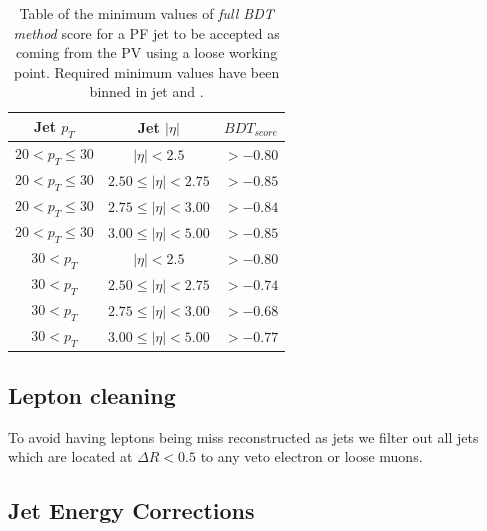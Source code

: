 \begin{table}[!htb]
\centering
\begin{tabular}{|c|c|c|}
\hline
Jet $p_{T}$          & Jet $|\eta|$              & $BDT_{score}$ \\
\hline \hline
$20 < p_{T} \leq 30$ & $|\eta| < 2.5$            & $> -0.80$ \\
$20 < p_{T} \leq 30$ & $2.50 \leq |\eta| < 2.75$ & $> -0.85$ \\
$20 < p_{T} \leq 30$ & $2.75 \leq |\eta| < 3.00$ & $> -0.84$ \\
$20 < p_{T} \leq 30$ & $3.00 \leq |\eta| < 5.00$ & $> -0.85$ \\
$30 < p_{T}$         & $|\eta| < 2.5$            & $> -0.80$ \\
$30 < p_{T}$         & $2.50 \leq |\eta| < 2.75$ & $> -0.74$ \\
$30 < p_{T}$         & $2.75 \leq |\eta| < 3.00$ & $> -0.68$ \\
$30 < p_{T}$         & $3.00 \leq |\eta| < 5.00$ & $> -0.77$ \\
\hline
\end{tabular}
\caption{Table of the minimum values of \textit{full \gls{BDT} method} score for a \gls{PF} jet to be accepted as coming from the \gls{PV} using a loose working point. Required minimum values have been binned in jet \pt and \eta.}
\label{TABLE:EventReconstructionAndSimulation_PileupJetIDFullBDTLooseWorkingPoint}
\end{table}

\subsection{Lepton cleaning}
\label{SECTION:EventReconstructionAndSimulation_Jets_LeptonCleaning}


To avoid having leptons being miss reconstructed as jets we filter out all jets which are located at $\Delta R < 0.5$ to any veto electron or loose muons.

\subsection{Jet Energy Corrections}
\label{SECTION:EventReconstructionAndSimulation_Jets_JetEnergyCorrections}

